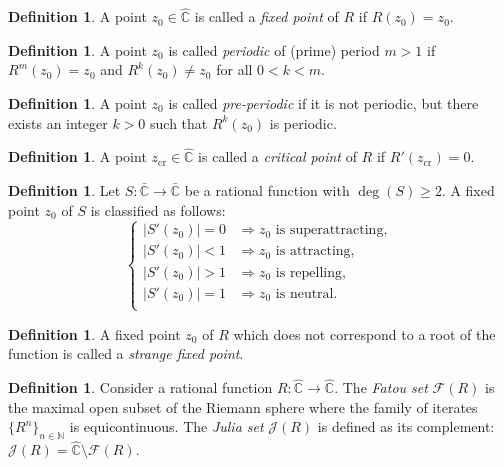 \documentclass{article}
\theoremstyle{definition}
\newtheorem{definition}[theorem]{Definition}
\theoremstyle{remark}
\begin{document}
\begin{definition}
	A point \( z_0 \in \widehat{\mathbb{C}} \) is called a \emph{fixed point} of \( R \) if \( R(z_0) = z_0 \).
\end{definition}

\begin{definition}
	A point \( z_0 \) is called \emph{periodic} of (prime) period \( m > 1 \) if \( R^m(z_0) = z_0 \) and \( R^k(z_0) \neq z_0 \) for all \( 0 < k < m \).
\end{definition}

\begin{definition}
	A point \( z_0 \) is called \emph{pre-periodic} if it is not periodic, but there exists an integer \( k > 0 \) such that \( R^k(z_0) \) is periodic.
\end{definition}

\begin{definition}
	A point \( z_{\mathrm{cr}} \in \widehat{\mathbb{C}} \) is called a \emph{critical point} of \( R \) if \( R'(z_{\mathrm{cr}}) = 0 \).
\end{definition}

\begin{definition}
Let \( S : \bar{\mathbb{C}} \to \bar{\mathbb{C}} \) be a rational function with \(\deg(S) \geq 2\). A fixed point \( z_0 \) of \( S \) is classified as follows:
\[
\begin{cases}
	|S'(z_{0})| = 0 & \Rightarrow z_{0} \text{ is superattracting}, \\[4pt]
	|S'(z_{0})| < 1 & \Rightarrow z_{0} \text{ is attracting}, \\[4pt]
	|S'(z_{0})| > 1 & \Rightarrow z_{0} \text{ is repelling}, \\[4pt]
	|S'(z_{0})| = 1 & \Rightarrow z_{0} \text{ is neutral}. \\[4pt]
\end{cases}
\]
\end{definition}

\begin{definition}
	A fixed point \( z_0 \) of \( R \) which does not correspond to a root of the function is called a \emph{strange fixed point}.
\end{definition}


\begin{definition}
	Consider a rational function \( R: \hat{\mathbb{C}} \to \hat{\mathbb{C}} \).
	The \emph{Fatou set} \( \mathcal{F}(R) \) is the maximal open subset of the Riemann sphere where the family of iterates \( \{ R^n \}_{n \in \mathbb{N}} \) is equicontinuous.
	The \emph{Julia set} \( \mathcal{J}(R) \) is defined as its complement: \( \mathcal{J}(R) = \hat{\mathbb{C}} \setminus \mathcal{F}(R) \).
\end{definition}
\end{document}
